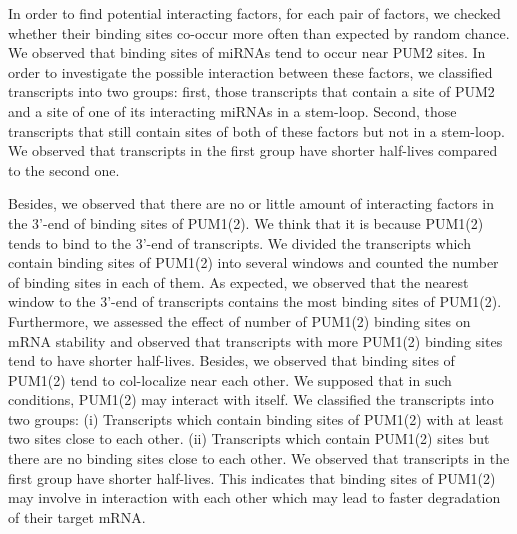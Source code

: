 In order to find potential interacting factors, for each pair of factors, we checked whether their binding sites co-occur more often than expected by random chance. We observed that binding sites of miRNAs tend to occur near PUM2 sites. In order to investigate the possible interaction between these factors, we classified transcripts into two groups: first, those transcripts that contain a site of PUM2 and a site of one of its interacting miRNAs in a stem-loop. Second, those transcripts that still contain sites of both of these factors but not in a stem-loop. We observed that transcripts in the first group have shorter half-lives compared to the second one.

Besides, we observed that there are no or little amount of interacting factors in the 3’-end of binding sites of PUM1(2). We think that it is because PUM1(2) tends to bind to the 3’-end of transcripts.  We divided the transcripts which contain binding sites of PUM1(2) into several windows and counted the number of binding sites in each of them. As expected, we observed that the nearest window to the 3'-end of transcripts contains the most binding sites of PUM1(2). Furthermore, we assessed the effect of number of PUM1(2) binding sites on mRNA stability and observed that transcripts with more PUM1(2) binding sites tend to have shorter half-lives. Besides, we observed that binding sites of PUM1(2) tend to col-localize near each other. We supposed that in such conditions, PUM1(2) may interact with itself. We classified the transcripts into two groups: (i) Transcripts which contain binding sites of PUM1(2) with at least two sites close to each other. (ii) Transcripts which contain PUM1(2) sites but there are no binding sites close to each other. We observed that transcripts in the first group have shorter half-lives. This indicates that binding sites of PUM1(2) may involve in interaction with each other which may lead to faster degradation of their target mRNA.

